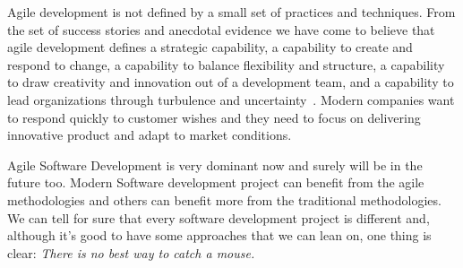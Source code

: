 Agile development is not defined by a small set of practices and techniques.
From the set of success stories and anecdotal evidence we have come to believe
that agile development defines a strategic capability, a capability to create
and respond to change, a capability to balance flexibility and structure, a
capability to draw creativity and innovation out of a development team, and a
capability to lead organizations through turbulence and uncertainty~\cite{one}. Modern
companies want to respond quickly to customer wishes and they need to focus on
delivering innovative product and adapt to market conditions.

Agile Software Development is very dominant now and surely will be in the
future too. Modern Software development project can benefit from the agile
methodologies and others can benefit more from the traditional methodologies.
We can tell for sure that every software development project is different and,
although it's good to have some approaches that we can lean on, one thing is
clear: \emph{There is no best way to catch a mouse.}


\printbibliography


